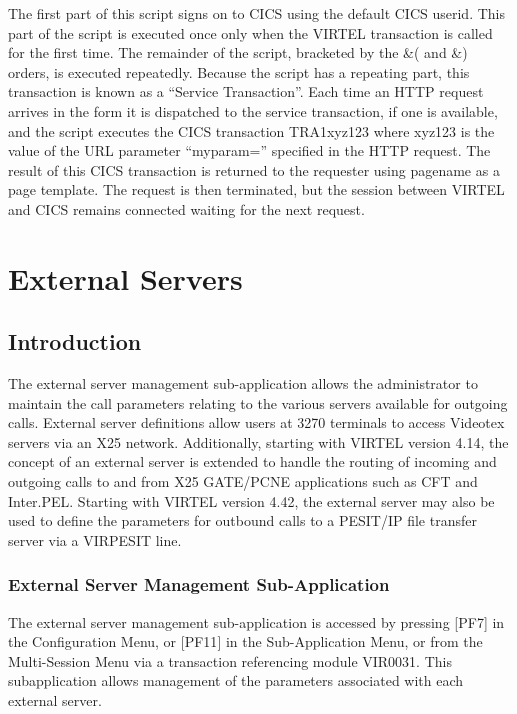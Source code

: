 \documentclass[letterpaper,10pt,english]{sphinxmanual}
\begin{document}

The first part of this script signs on to CICS using the default CICS userid. This part of the script is executed once only when the VIRTEL transaction is called for the first time. The remainder of the script, bracketed by the \&( and \&) orders, is executed repeatedly. Because the script has a repeating part, this transaction is known as a “Service Transaction”. Each time an HTTP request arrives in the form  it is dispatched to the service transaction, if one is available, and the script executes the CICS transaction TRA1xyz123 where xyz123 is the value of the URL parameter “myparam=” specified in the HTTP request. The result of this CICS transaction is returned to the requester using pagename as a page template. The request is then terminated, but the session between VIRTEL and CICS remains connected waiting for the next request.


\chapter{External Servers}
\label{\detokenize{connectivity_guide:external-servers}}\label{\detokenize{connectivity_guide:index-129}}

\section{Introduction}
\label{\detokenize{connectivity_guide:id66}}
The external server management sub-application allows the administrator to maintain the call parameters relating to the various servers available for outgoing calls. External server definitions allow users at 3270 terminals to access Videotex servers via an X25 network. Additionally, starting with VIRTEL version 4.14, the concept of an external server
is extended to handle the routing of incoming and outgoing calls to and from X25 GATE/PCNE applications such as CFT and Inter.PEL. Starting with VIRTEL version 4.42, the external server may also be used to define the parameters for outbound calls to a PESIT/IP file transfer server via a VIRPESIT line.


\subsection{External Server Management Sub-Application}
\label{\detokenize{connectivity_guide:external-server-management-sub-application}}\label{\detokenize{connectivity_guide:index-130}}
The external server management sub-application is accessed by pressing {[}PF7{]} in the Configuration Menu, or {[}PF11{]} in the Sub-Application Menu, or from the Multi-Session Menu via a transaction referencing module VIR0031. This subapplication allows management of the parameters associated with each external server.
\end{document}
